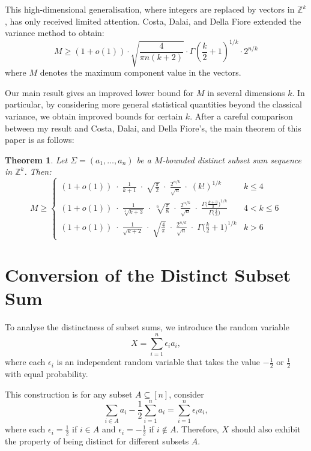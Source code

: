 \documentclass[11pt]{amsart}
\theoremstyle{plain}
\newtheorem{theorem}{Theorem}[section]
\theoremstyle{definition}
\numberwithin{equation}{section}
\begin{document}
This high-dimensional generalisation, where integers are replaced by vectors in $\mathbb{Z}^k$, has only received limited attention. Costa, Dalai, and Della Fiore \cite{costa2021variations} extended the variance method to obtain:
\[
M \geq (1+o(1)) \cdot \sqrt{\frac{4}{\pi n(k+2)}} \cdot \Gamma\left(\frac{k}{2}+1\right)^{1/k} \cdot 2^{n/k}
\]
where $M$ denotes the maximum component value in the vectors.

Our main result gives an improved lower bound for $M$ in several dimensions $k$. In particular, by considering more general statistical quantities beyond the classical variance, we obtain improved bounds for certain $k$. After a careful comparison between my result and Costa, Dalai, and Della Fiore's, the main theorem of this paper is as follows:
\begin{theorem}\label{mainthe}
    Let $\Sigma = (a_1,\ldots,a_n)$ be a \emph{$M$-bounded distinct subset sum sequence} in $\mathbb{Z}^k$. Then:
\[
    M \geq 
    \begin{cases}
        (1+o(1))\;\cdot\;\frac{1}{k+1}\;\cdot\;\sqrt{\frac{\pi}{2}}\;\cdot\;\frac{2^{n/k}}{\sqrt{n}}\;\cdot\;(k!)^{1/k} & k \leq 4 \\[1.5ex]
        (1+o(1))\;
        \cdot\;
        \frac{1}{\sqrt[3]{k+3}}\;
        \cdot\;
        \sqrt[6]{\frac{\pi}{8}}\;
        \cdot\;
        \frac{2^{n/k}}{\sqrt{n}}\;
        \cdot\;
        \frac{\Gamma\!\big(\tfrac{k+3}{3}\big)^{1/k}}{\Gamma\!\big(\tfrac{4}{3}\big)} & 4 < k \leq 6 \\[1.5ex]
        (1+o(1))\;\cdot\;\frac{1}{\sqrt{k+2}}\;\cdot\;\sqrt{\tfrac{4}{\pi}}\;\cdot\;\frac{2^{n/k}}{\sqrt{n}}\;\cdot\;\Gamma\!\big(\tfrac{k}{2}+1\big)^{1/k} & k > 6
    \end{cases}
\]
\end{theorem}
\section{Conversion of the Distinct Subset Sum}
To analyse the distinctness of subset sums, we introduce the random variable
\[
X = \sum_{i=1}^{n} \epsilon_i a_i,
\]
where each $\epsilon_i$ is an independent random variable that takes the value $-\frac{1}{2}$ or $\frac{1}{2}$ with equal probability. 

This construction is for any subset $A \subseteq [n]$, consider
\[
\sum_{i \in A} a_i - \frac{1}{2} \sum_{i=1}^n a_i = \sum_{i=1}^n \epsilon_i a_i,
\]
where each $\epsilon_i = \frac{1}{2}$ if $i \in A$ and $\epsilon_i = -\frac{1}{2}$ if $i \notin A$. Therefore, $X$ should also exhibit the property of being distinct for different subsets $A$.
\end{document}
